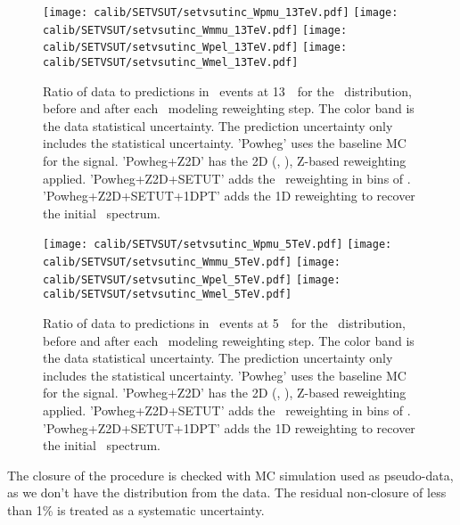      
     \begin{figure}[pt]
     	\texttt{[image: calib/SETVSUT/setvsutinc\_Wpmu\_13TeV.pdf]}%
     	\texttt{[image: calib/SETVSUT/setvsutinc\_Wmmu\_13TeV.pdf]}
		\texttt{[image: calib/SETVSUT/setvsutinc\_Wpel\_13TeV.pdf]}%
     	\texttt{[image: calib/SETVSUT/setvsutinc\_Wmel\_13TeV.pdf]}
     	\caption{Ratio of data to predictions in
     		\Wmn\ events at 13~\TeV\ for the \setue\ distribution, before and after each \setue\ modeling reweighting step. The color band is the data statistical uncertainty. The prediction uncertainty only includes the statistical uncertainty. 'Powheg' uses the baseline MC for the signal. 'Powheg+Z2D' has the 2D (\setue, \pttruthv), Z-based reweighting applied. 'Powheg+Z2D+SETUT' adds the \setue\ reweighting in bins of \ut. 'Powheg+Z2D+SETUT+1DPT' adds the 1D reweighting to recover the initial \pttruthv\ spectrum.}
     	\label{fig:setCalibDataMCRatio13}
     \end{figure}
     
     
     \begin{figure}[pt]
     	\texttt{[image: calib/SETVSUT/setvsutinc\_Wpmu\_5TeV.pdf]}%
		\texttt{[image: calib/SETVSUT/setvsutinc\_Wmmu\_5TeV.pdf]}
		\texttt{[image: calib/SETVSUT/setvsutinc\_Wpel\_5TeV.pdf]}%
		\texttt{[image: calib/SETVSUT/setvsutinc\_Wmel\_5TeV.pdf]}
     	\caption{Ratio of data to predictions in
     		\Wmn\ events at 5~\TeV\ for the \setue\ distribution, before and after each \setue\ modeling reweighting step. The color band is the data statistical uncertainty. The prediction uncertainty only includes the statistical uncertainty. 'Powheg' uses the baseline MC for the signal. 'Powheg+Z2D' has the 2D (\setue, \pttruthv), Z-based reweighting applied. 'Powheg+Z2D+SETUT' adds the \setue\ reweighting in bins of \ut. 'Powheg+Z2D+SETUT+1DPT' adds the 1D reweighting to recover the initial \pttruthv\ spectrum.}
     	\label{fig:setCalibDataMCRatio5}
     \end{figure}
     
     The closure of the procedure is checked with \Sherpa MC simulation used as pseudo-data, as we don't have the \ptv distribution from the data. The residual non-closure of less than 1\% is treated as a systematic uncertainty.
